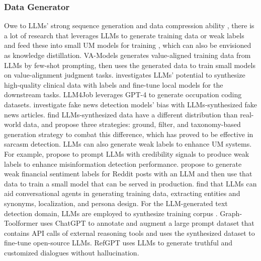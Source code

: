 \documentclass[11pt]{article}
\begin{document}
\subsubsection{Data Generator}
Owe to LLMs' strong sequence generation and data compression ability \cite{yu2023large}, there is a lot of research that leverages LLMs to generate training data or weak labels and feed these into small UM models for training \cite{peng2023generating, borisov2022language, viswanathan2023prompt2model}, which can also be envisioned as knowledge distillation. 
VA-Models \cite{bang2022enabling} generates value-aligned training data from LLMs by few-shot prompting, then uses the generated data to train small models on value-alignment judgment tasks. 
\citet{tang2023does} investigates LLMs' potential to synthesize high-quality clinical data with labels and fine-tune local models for the downstream tasks. 
LLM4Job \cite{li2023llm4jobs} leverages GPT-4 to generate occupation coding datasets. \citet{su2023fake} investigate fake news detection models' bias with LLMs-synthesized fake news articles. \citet{veselovsky2023generating} find LLMs-synthesized data have a different distribution than real-world data, and propose three strategies: ground, filter, and taxonomy-based generation strategy to combat this difference, which has proved to be effective in sarcasm detection. LLMs can also generate weak labels to enhance UM systems. For example, \citet{leite2023detecting} propose to prompt LLMs with credibility signals to produce weak labels to enhance misinformation detection performance. \citet{deng2023llms} propose to generate weak financial sentiment labels for Reddit posts with an LLM and then use that data to train a small model that can be served in production. 
\citet{foosherian2023enhancing} find that LLMs can aid conversational agents in generating training data, extracting entities and synonyms, localization, and persona design. For the LLM-generated text detection domain, LLMs are employed to synthesize training corpus \cite{yu2023gpt, chen2023can, liu2022coco, yu2023pre}. Graph-Toolformer \cite{zhang2023graph} uses ChatGPT to annotate and augment a large prompt dataset that contains API calls of external reasoning tools and uses the synthesized dataset to fine-tune open-source LLMs. RefGPT \cite{yang2023refgpt} uses LLMs to generate truthful and customized dialogues without hallucination.
\end{document}
